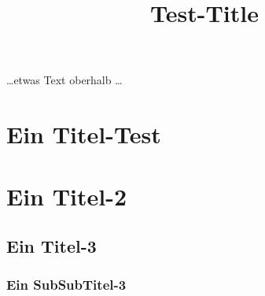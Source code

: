 \documentclass[10pt,a4paper]{report}
\title{Test-Title}
\begin{document}
\maketitle
\tableofcontents \newpage

\ldots etwas Text oberhalb \ldots
\section{Ein Titel-Test}
\section{Ein Titel-2}
\subsection{Ein Titel-3}
\subsubsection{Ein SubSubTitel-3}
\end{document}
